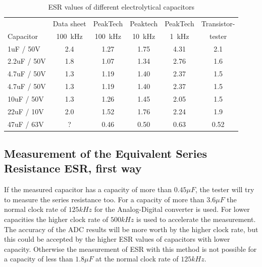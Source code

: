 \begin{table}[H]
  \begin{center}
    \begin{tabular}{| l | c | c | c | c | c |}
   \hline
            & Data sheet & PeakTech  & Peaktech & PeakTech & Transistor- \\
Capacitor   & 100~kHz    & 100~kHz   & 10~kHz   & 1~kHz    & tester  \\
    \hline
    \hline
1uF / 50V    & 2.4       & 1.27      & 1.75     & 4.31     &  2.1 \\
    \hline
2.2uF / 50V  & 1.8       & 1.07      & 1.34     & 2.76     &  1.6 \\
    \hline
4.7uF / 50V  & 1.3       & 1.19      & 1.40     & 2.37     &  1.5 \\
    \hline
4.7uF / 50V  & 1.3       & 1.19      & 1.40     & 2.37     &  1.5 \\
    \hline
10uF / 50V   & 1.3       & 1.26      & 1.45     & 2.05     &  1.5 \\
    \hline
22uF / 10V   & 2.0       & 1.52      & 1.76     & 2.24     &  1.9 \\
    \hline
47uF / 63V   & ?         & 0.46      & 0.50     & 0.63     &  0.52 \\
    \hline
    \end{tabular}
  \end{center}
  \caption{ESR values of different electrolytical capacitors}
  \label{tab:capESR} 
\end{table}


\subsection{Measurement of the Equivalent Series Resistance ESR, first way}
If the measured capacitor has a capacity of more than \(0.45\mu F\), the tester will try to measure
the series resistance too.
For a capacity of more than \(3.6\mu F\) the normal clock rate of \(125kHz\) for the Analog-Digital converter is used.
For lower capacities the higher clock rate of \(500kHz\) is used to accelerate the measurement.
The accuracy of the ADC results will be more worth by the higher clock rate, but this could be accepted by the
higher ESR values of capacitors with lower capacity.
Otherwise the measurement of ESR with this method is not possible for a capacity of less than \(1.8\mu F\) at the normal
clock rate of \(125kHz\).

